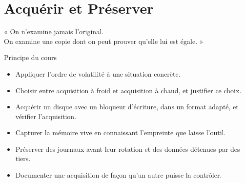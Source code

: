
\chapter{Acquérir et Préserver}
\label{chap:acquisition}

\epigraph{%
    « On n'examine jamais l'original.\\
    On examine une copie dont on peut prouver qu'elle lui est égale. »%
}{Principe du cours}


\begin{boxobjectifs}
\begin{itemize}
    \item Appliquer l'ordre de volatilité à une situation concrète.
    \item Choisir entre acquisition à froid et acquisition à chaud, et
          justifier ce choix.
    \item Acquérir un disque avec un bloqueur d'écriture, dans un format
          adapté, et vérifier l'acquisition.
    \item Capturer la mémoire vive en connaissant l'empreinte que laisse
          l'outil.
    \item Préserver des journaux avant leur rotation et des données
          détenues par des tiers.
    \item Documenter une acquisition de façon qu'un autre puisse la
          contrôler.
\end{itemize}
\end{boxobjectifs}

